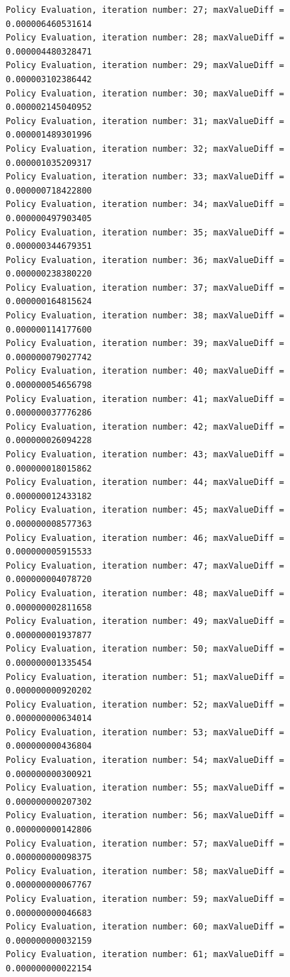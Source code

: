 \documentclass{article}
\begin{document}
\begin{scriptsize}
\begin{verbatim}
Policy Evaluation, iteration number: 27; maxValueDiff = 0.000006460531614 
Policy Evaluation, iteration number: 28; maxValueDiff = 0.000004480328471 
Policy Evaluation, iteration number: 29; maxValueDiff = 0.000003102386442 
Policy Evaluation, iteration number: 30; maxValueDiff = 0.000002145040952 
Policy Evaluation, iteration number: 31; maxValueDiff = 0.000001489301996 
Policy Evaluation, iteration number: 32; maxValueDiff = 0.000001035209317 
Policy Evaluation, iteration number: 33; maxValueDiff = 0.000000718422800 
Policy Evaluation, iteration number: 34; maxValueDiff = 0.000000497903405 
Policy Evaluation, iteration number: 35; maxValueDiff = 0.000000344679351 
Policy Evaluation, iteration number: 36; maxValueDiff = 0.000000238380220 
Policy Evaluation, iteration number: 37; maxValueDiff = 0.000000164815624 
Policy Evaluation, iteration number: 38; maxValueDiff = 0.000000114177600 
Policy Evaluation, iteration number: 39; maxValueDiff = 0.000000079027742 
Policy Evaluation, iteration number: 40; maxValueDiff = 0.000000054656798 
Policy Evaluation, iteration number: 41; maxValueDiff = 0.000000037776286 
Policy Evaluation, iteration number: 42; maxValueDiff = 0.000000026094228 
Policy Evaluation, iteration number: 43; maxValueDiff = 0.000000018015862 
Policy Evaluation, iteration number: 44; maxValueDiff = 0.000000012433182 
Policy Evaluation, iteration number: 45; maxValueDiff = 0.000000008577363 
Policy Evaluation, iteration number: 46; maxValueDiff = 0.000000005915533 
Policy Evaluation, iteration number: 47; maxValueDiff = 0.000000004078720 
Policy Evaluation, iteration number: 48; maxValueDiff = 0.000000002811658 
Policy Evaluation, iteration number: 49; maxValueDiff = 0.000000001937877 
Policy Evaluation, iteration number: 50; maxValueDiff = 0.000000001335454 
Policy Evaluation, iteration number: 51; maxValueDiff = 0.000000000920202 
Policy Evaluation, iteration number: 52; maxValueDiff = 0.000000000634014 
Policy Evaluation, iteration number: 53; maxValueDiff = 0.000000000436804 
Policy Evaluation, iteration number: 54; maxValueDiff = 0.000000000300921 
Policy Evaluation, iteration number: 55; maxValueDiff = 0.000000000207302 
Policy Evaluation, iteration number: 56; maxValueDiff = 0.000000000142806 
Policy Evaluation, iteration number: 57; maxValueDiff = 0.000000000098375 
Policy Evaluation, iteration number: 58; maxValueDiff = 0.000000000067767 
Policy Evaluation, iteration number: 59; maxValueDiff = 0.000000000046683 
Policy Evaluation, iteration number: 60; maxValueDiff = 0.000000000032159 
Policy Evaluation, iteration number: 61; maxValueDiff = 0.000000000022154 

\end{verbatim}
\end{scriptsize}
\end{document}
